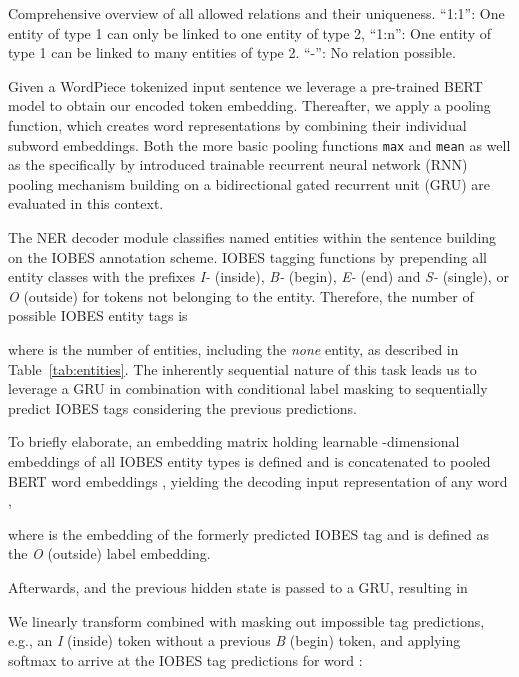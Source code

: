 \documentclass[conference, table]{IEEEtran}
\newcommand{\1} {\mathbbm{1}}
\begin{document}
\begin{table}[t]
%
 \caption{Comprehensive overview of all allowed relations and their uniqueness. ``1:1'': One entity of type 1 can only be linked to one entity of type 2, ``1:n'': One entity of type 1 can be linked to many entities of type 2. ``-'': No relation possible.}
\label{tab:relations}
\end{table}

Given a WordPiece \cite{schuster2012japanese} tokenized input sentence we leverage a pre-trained BERT \cite{devlin2018bert} model to obtain our encoded token embedding. Thereafter, we apply a pooling function, which creates word representations by combining their individual subword embeddings. Both the more basic pooling functions \texttt{max} and \texttt{mean} as well as the specifically by \cite{kpi-bert} introduced  trainable recurrent neural network (RNN) pooling mechanism building on a bidirectional gated recurrent unit (GRU) \cite{cho2014properties} are evaluated in this context.

The NER decoder module classifies named entities within the sentence building on the IOBES annotation scheme. IOBES tagging functions by prepending all entity classes with the prefixes \textit{I-} (inside), \textit{B-} (begin), \textit{E-} (end) and \textit{S-} (single), or \textit{O} (outside) for tokens not belonging to the entity. Therefore, the number of possible IOBES entity tags is
 
where  is the number of entities, including the \textit{none} entity, as described in Table~\ref{tab:entities}. The inherently sequential nature of this task leads us to leverage a GRU in combination with conditional label masking to sequentially predict IOBES tags considering the previous predictions. 

To briefly elaborate, an embedding matrix  holding learnable -dimensional embeddings of all IOBES entity types is defined and is concatenated to pooled BERT word embeddings , yielding the decoding input representation of any word ,

where  is the embedding of the formerly predicted IOBES tag and  is defined as the \textit{O} (outside) label embedding.

Afterwards,  and the previous hidden state  is passed to a GRU, resulting in

We linearly transform  combined with masking out impossible tag predictions, e.g., an \textit{I} (inside) token without a previous \textit{B} (begin) token, and applying softmax to arrive at the IOBES tag predictions for word :
\end{document}
